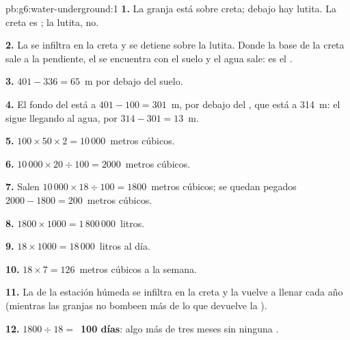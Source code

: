 \begin{solution}{pb:g6:water-underground:1}
\textbf{1.} La granja está sobre creta; debajo hay lutita. La creta es
; la lutita, no.

\textbf{2.} La  se infiltra en la creta y se detiene sobre la
lutita. Donde la base de la creta sale a la pendiente, el  se
encuentra con el suelo y el agua sale: es el .

\textbf{3.} $401 - 336 = 65$~m por debajo del suelo.

\textbf{4.} El fondo del  está a $401 - 100 = 301$~m, por debajo del
, que está a 314~m: el  sigue llegando al agua, por $314 - 301 =
13$~m.

\textbf{5.} $100 \times 50 \times 2 = 10\,000$~metros cúbicos.

\textbf{6.} $10\,000 \times 20 \div 100 = 2000$~metros cúbicos.

\textbf{7.} Salen $10\,000 \times 18 \div 100 = 1800$~metros cúbicos; se
quedan pegados $2000 - 1800 = 200$~metros cúbicos.

\textbf{8.} $1800 \times 1000 = 1\,800\,000$~litros.

\textbf{9.} $18 \times 1000 = 18\,000$~litros al día.

\textbf{10.} $18 \times 7 = 126$~metros cúbicos a la semana.

\textbf{11.} La  de la estación húmeda se infiltra en la creta y la
vuelve a llenar cada año (mientras las granjas no bombeen más de lo que
devuelve la ).

\textbf{12.} $1800 \div 18 = $~\textbf{100 días}: algo más de tres meses
sin ninguna .
\end{solution}
